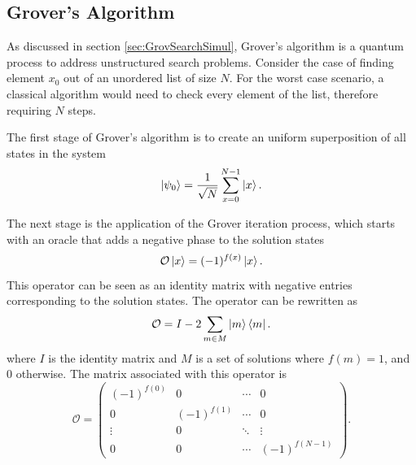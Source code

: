 \documentclass[../../dissertation.tex]{subfiles}
\begin{document}
\subsection{Grover's Algorithm}
As discussed in section \ref{sec:GrovSearchSimul}, Grover's algorithm is a
quantum process to address unstructured search problems. Consider the case of
finding element $x_0$ out of an unordered list of size $N$. For the worst case
scenario, a classical algorithm would need to check every element of the list,
therefore requiring $N$ steps.\par

The first stage of Grover's algorithm is to create an uniform superposition of
all states in the system
\begin{equation}
	\ket{\psi_0}  = \frac{1}{\sqrt{N}}\sum_{x=0}^{N-1} \ket{x}.
\end{equation}\par

The next stage is the application of the Grover iteration process, which starts
with an oracle that adds a negative phase to the solution states
\begin{equation}
        \mathcal{O}\ket{x} = (-1)^{f(x)}\ket{x}.
\end{equation}
This operator can be seen as an identity matrix with negative entries
corresponding to the solution states. The operator can be rewritten as 
\begin{equation}
	\mathcal{O} = I - 2\sum_{m\in M} \ket{m}\bra{m}.
	\label{eq:groverQiskitOracle}
\end{equation}
where $I$ is the identity matrix and $M$ is a set of solutions where $f(m) =
1$, and $0$ otherwise. The matrix associated with this operator is
\begin{equation}
	\mathcal{O} = 
	\begin{pmatrix}
		(-1)^{f(0)} & 0 & \cdots & 0\\
	        0 & (-1)^{f(1)} & \cdots & 0\\ 
	        \vdots & 0 &  \ddots & \vdots\\ 
		0 & 0 & \cdots &  (-1)^{f(N-1)}
	\end{pmatrix}.
	\label{eq:oracleMatrixQiskit}
\end{equation}\par
\end{document}
